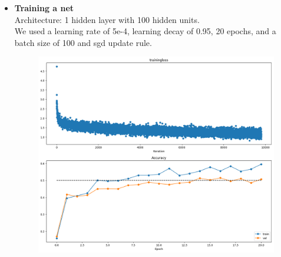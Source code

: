 \begin{itemize}
  \item \textbf{Training a net}\\
    Architecture: 1 hidden layer with 100 hidden units.\\
    We used a learning rate of 5e-4, learning decay of 0.95, 20 epochs, and a batch size of 100 and sgd update rule.
    
    \begin{figure}[!ht]
        \centering
        {{\includegraphics[scale = 0.35]{../nets/train_net/diagrams.png}}}  
    \end{figure}


\end{itemize}
